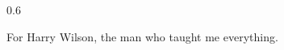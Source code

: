 \cleardoublepage

\vspace*{8cm}

\hfill
\begin{parbox}{0.6\textwidth}{
        \begin{flushright}

            For Harry Wilson, the man who taught me everything.

        \end{flushright}}
\end{parbox}


